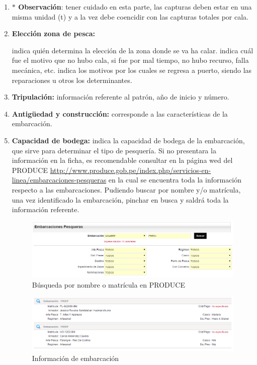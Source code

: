 \documentclass[a4paper,oneside,11pt]{book}
\begin{document}
\begin{enumerate}
\item [] \textbf{$\ast$ Observación}: tener cuidado en esta parte, las capturas deben estar en una misma unidad (t) y a la vez  debe coencidir con las capturas totales por cala.

\item \textbf{{Elección zona de pesca:}}

 indica quién determina la elección de la zona donde se va ha calar.
 indica cuál fue el motivo que no hubo cala, si fue por mal tiempo, no hubo recurso, falla mecánica, etc.
 indica los motivos por los cuales se regresa a puerto, siendo las reparaciones u otros los determinantes.

\item \textbf{{Tripulación:} } información referente al patrón, año de inicio y número.

\item \textbf{{Antigüedad y construcción:}} corresponde a las características de la embarcación.

\item \textbf{{Capacidad de bodega:}} indica la capacidad de bodega de la embarcación, que sirve para determinar el tipo de pesquería. Si no presentara la información en la ficha, es recomendable consultar en la página wed del PRODUCE \url{http://www.produce.gob.pe/index.php/servicios-en-linea/embarcaciones-pesqueras} en la cual se encuentra toda la información respecto a las embarcaciones. Pudiendo buscar por nombre y/o matrícula, una vez identificado la embarcación, pinchar en busca y saldrá toda la información referente.
\begin{figure}
\centering
\includegraphics[width=0.7\linewidth]{./imagen_Manual_PBP/prod1}
\caption{Búsqueda por nombre o matrícula en PRODUCE}
\label{fig:prod1}
\end{figure}
\begin{figure}
\centering
\includegraphics[width=0.7\linewidth]{./imagen_Manual_PBP/prod2}
\caption{Información de embarcación}
\label{fig:prod2}
\end{figure}


\end{enumerate}
\end{document}
